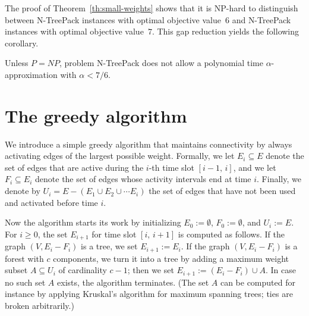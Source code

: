 \documentclass[runningheads]{llncs}
\newcommand{\xxxNTP}{{\sc N-TreePack}}
\newcommand{\greedy}{\text{\sf Greedy}}
\begin{document}
The proof of Theorem~\ref{th:small-weights} shows that it is NP-hard to distinguish between
{\xxxNTP} instances with optimal objective value~$6$ and {\xxxNTP} instances with optimal objective value~$7$.
This gap reduction yields the following corollary.
\begin{corollary}
\label{coro:inapproximability}
Unless $P=NP$, problem {\xxxNTP} does not allow a polynomial time $\alpha$-approximation 
with $\alpha<7/6$.
\end{corollary}



\section{The greedy algorithm}
\label{sec:greedy}
We introduce a simple greedy algorithm that maintains connectivity by always
activating edges of the largest possible weight.
Formally, we let $E_i\subseteq E$ denote the set of edges that are active during
the $i$-th time slot $[i-1,\,i]$, and we let $F_i\subseteq E_i$ denote the set of
edges whose activity intervals end at time $i$.
Finally, we denote by $U_i=E-(E_1\cup E_2\cup\cdots E_i)$ the set of edges that
have not been used and activated before time $i$.

Now the {\greedy} algorithm starts its work by initializing 
$E_0:=\emptyset$, $F_0:=\emptyset$, and $U_i:=E$.
For $i\ge0$, the set $E_{i+1}$ for time slot $[i,\,i+1]$ is computed as follows.
If the graph $(V,E_i-F_i)$ is a tree, we set $E_{i+1}:=E_i$.
If the graph $(V,E_i-F_i)$ is a forest with $c$ components, we turn it into 
a tree by adding a maximum weight subset $A\subseteq U_i$ of cardinality $c-1$;
then we set $E_{i+1}:=(E_i-F_i)\cup A$.
In case no such set $A$ exists, the {\greedy} algorithm terminates.
(The set $A$ can be computed for instance by applying Kruskal's algorithm for 
maximum spanning trees; ties are broken arbitrarily.)
\end{document}
